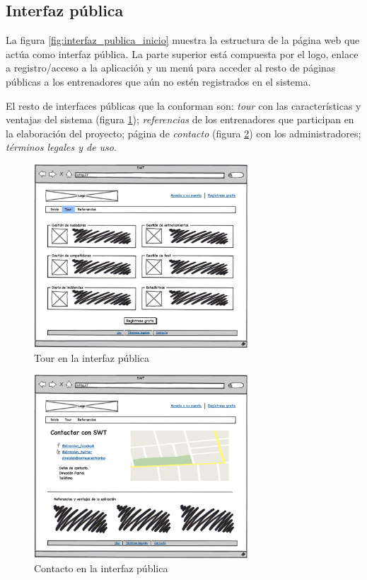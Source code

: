 	\subsection{Interfaz pública} %
		\label{sub:interfaz_publica}
		
		La figura \ref{fig:interfaz_publica_inicio} muestra la estructura de la página web que actúa como interfaz pública. La parte superior está compuesta por el logo, enlace a registro/acceso a la aplicación y un menú para acceder al resto de páginas públicas a los entrenadores que aún no estén registrados en el sistema.
			
		El resto de interfaces públicas que la conforman son: {\it tour} con las características y ventajas del sistema (figura \ref{fig:interfaz_publica_tour}); {\it referencias} de los entrenadores que participan en la elaboración del proyecto; página de {\it contacto} (figura \ref{fig:interfaz_publica_contacto}) con los administradores; {\it términos legales y de uso}. 
		
		\begin{figure}[H]
		  \centering
		    \includegraphics[width=8cm]{./eps/2_Tour.eps}
		  \caption{Tour en la interfaz pública}
		  \label{fig:interfaz_publica_tour}
		\end{figure}

		\begin{figure}[H]
		  \centering
		    \includegraphics[width=8cm]{./eps/3_Contacto.eps}
		  \caption{Contacto en la interfaz pública}
		  \label{fig:interfaz_publica_contacto}
		\end{figure}

